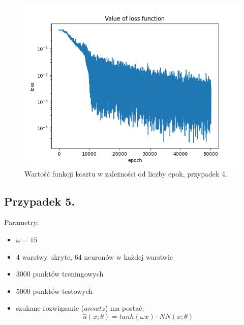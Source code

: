 \documentclass[11pt, leqno]{scrartcl}
\begin{document}
    \begin{figure}[H]
        \centering
        \includegraphics[width=0.7\linewidth]{nn_b3_loss.png}
        \caption{Wartość funkcji kosztu w zależności od liczby epok,
            przypadek 4.}
    \end{figure}

    \subsection{Przypadek 5.}
    Parametry:
    \begin{itemize}
        \item $\omega =15$
        \item 4 warstwy ukryte, 64 neuronów w każdej warstwie
        \item 3000 punktów treningowych
        \item 5000 punktów testowych
        \item szukane rozwiązanie ($ansatz$) ma postać:
            \[
                \hat{u}(x;\theta)=tanh(\omega x)\cdot NN(x;\theta)
            \]
    \end{itemize}
\end{document}
